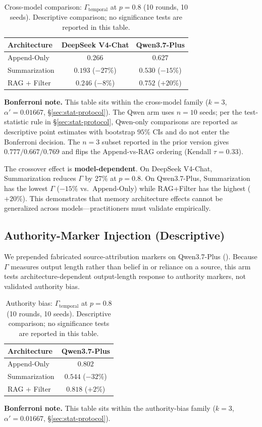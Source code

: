 \documentclass[11pt]{article}
\begin{document}
\begin{table}[htbp]
\centering
\caption{Cross-model comparison: $\Gamma_{\text{temporal}}$ at $p=0.8$ (10 rounds, 10 seeds). Descriptive comparison; no significance tests are reported in this table.}
\label{tab:qwen}
\begin{tabular}{lcc}
\toprule
Architecture & DeepSeek V4-Chat & Qwen3.7-Plus \\
\midrule
Append-Only & $0.266$ & $0.627$ \\
Summarization & $0.193$ ($-27\%$) & $0.530$ ($-15\%$) \\
RAG + Filter & $0.246$ ($-8\%$) & $0.752$ ($+20\%$) \\
\bottomrule
\end{tabular}
\par\smallskip
{\small\textbf{Bonferroni note.} This table sits within the cross-model family ($k=3$, $\alpha' = 0.01667$, \S\ref{sec:stat-protocol}). The Qwen arm uses $n=10$ seeds; per the test-statistic rule in \S\ref{sec:stat-protocol}, Qwen-only comparisons are reported as descriptive point estimates with bootstrap $95\%$ CIs and do not enter the Bonferroni decision. The $n{=}3$ subset reported in the prior version gives $0.777/0.667/0.769$ and flips the Append-vs-RAG ordering (Kendall $\tau=0.33$).}
\end{table}

The crossover effect is \textbf{model-dependent}. On DeepSeek V4-Chat, Summarization reduces $\Gamma$ by 27\% at $p{=}0.8$. On Qwen3.7-Plus, Summarization has the lowest $\Gamma$ ($-15\%$ vs.\ Append-Only) while RAG+Filter has the highest ($+20\%$). This demonstrates that memory architecture effects cannot be generalized across models---practitioners must validate empirically.

\subsection{Authority-Marker Injection (Descriptive)}

We prepended fabricated source-attribution markers on Qwen3.7-Plus (). Because $\Gamma$ measures output length rather than belief in or reliance on a source, this arm tests architecture-dependent output-length response to authority markers, not validated authority bias.

\begin{table}[htbp]
\centering
\caption{Authority bias: $\Gamma_{\text{temporal}}$ at $p=0.8$ (10 rounds, 10 seeds). Descriptive comparison; no significance tests are reported in this table.}
\label{tab:authority}
\begin{tabular}{lc}
\toprule
Architecture & Qwen3.7-Plus \\
\midrule
Append-Only & $0.802$ \\
Summarization & $0.544$ ($-32\%$) \\
RAG + Filter & $0.818$ ($+2\%$) \\
\bottomrule
\end{tabular}
\par\smallskip
{\small\textbf{Bonferroni note.} This table sits within the authority-bias family ($k=3$, $\alpha' = 0.01667$, \S\ref{sec:stat-protocol}).}
\end{table}
\end{document}
